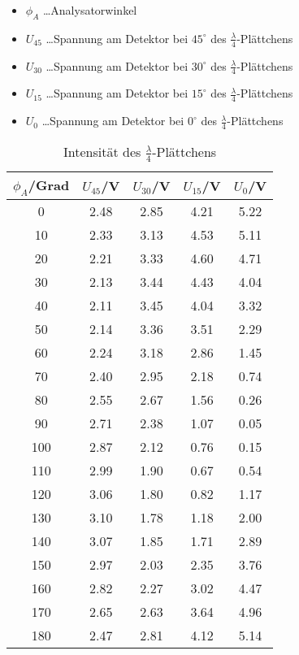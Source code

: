 \documentclass[a4paper]{article}
\begin{document}
\begin{table}[ht]
  \centering
  \caption{Intensität des $\frac{\lambda}{4}$-Plättchens}
  \begin{itemize}
    \item $\phi_A$ \dots Analysatorwinkel
    \item $U_{45}$ \dots Spannung am Detektor bei $45^\circ$ des $\frac{\lambda}{4}$-Plättchens
    \item $U_{30}$ \dots Spannung am Detektor bei $30^\circ$ des $\frac{\lambda}{4}$-Plättchens
    \item $U_{15}$ \dots Spannung am Detektor bei $15^\circ$ des $\frac{\lambda}{4}$-Plättchens
    \item $U_{0}$ \dots Spannung am Detektor bei $0^\circ$ des $\frac{\lambda}{4}$-Plättchens
  \end{itemize}
  \begin{tabular}{|c|c|c|c|c|}
    \hline
    $\phi_A$/Grad&$U_{45}$/V&$U_{30}$/V&$U_{15}$/V&$U_{0}$/V\\
    \hline
   0&2.48&2.85&4.21&5.22\\
    \hline
   10&2.33&3.13&4.53&5.11\\
    \hline
   20&2.21&3.33&4.60&4.71\\
    \hline
   30&2.13&3.44&4.43&4.04\\
    \hline
   40&2.11&3.45&4.04&3.32\\
    \hline
   50&2.14&3.36&3.51&2.29\\
    \hline
   60&2.24&3.18&2.86&1.45\\
    \hline
   70&2.40&2.95&2.18&0.74\\
    \hline
   80&2.55&2.67&1.56&0.26\\
    \hline
   90&2.71&2.38&1.07&0.05\\
    \hline
   100&2.87&2.12&0.76&0.15\\
    \hline
   110&2.99&1.90&0.67&0.54\\
    \hline
   120&3.06&1.80&0.82&1.17\\
    \hline
   130&3.10&1.78&1.18&2.00\\
    \hline
   140&3.07&1.85&1.71&2.89\\
    \hline
   150&2.97&2.03&2.35&3.76\\
    \hline
   160&2.82&2.27&3.02&4.47\\
    \hline
   170&2.65&2.63&3.64&4.96\\
    \hline
   180&2.47&2.81&4.12&5.14\\
    \hline
  \end{tabular}
  \label{tab:2}
\end{table}
\newpage
\end{document}
